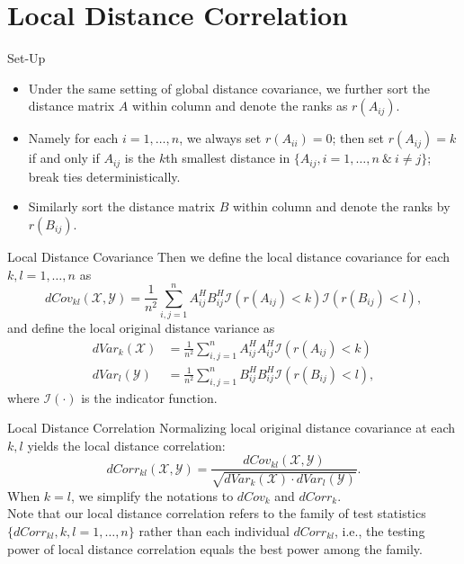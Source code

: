 \documentclass{beamer}
\begin{document}
\section{Local Distance Correlation}
\begin{frame}{Set-Up}
\begin{itemize}[<+->]
\item Under the same setting of global distance covariance, we further sort the distance matrix $A$ within column and denote the ranks as $r(A_{ij})$.
\item Namely for each $i=1, \ldots, n$, we always set $r(A_{ii})=0$; then set $r(A_{ij})=k$ if and only if $A_{ij}$ is the $k$th smallest distance in $\{A_{ij}, i=1,\ldots,n\ \& \ i \neq j\}$; break ties deterministically. 
\item Similarly sort the distance matrix $B$ within column and denote the ranks by $r(B_{ij})$.
\end{itemize}
\end{frame}

\begin{frame}{Local Distance Covariance}
Then we define the local distance covariance for each $k,l=1,\ldots,n$ as
\begin{equation}
\label{localdCovEqu}
dCov_{kl}(\mathcal{X},\mathcal{Y})=\frac{1}{n^2}\sum_{i,j=1}^{n}A^{H}_{ij}B^{H}_{ij}\mathcal{I}(r(A_{ij})<k)\mathcal{I}(r(B_{ij})<l),
\end{equation}
and define the local original distance variance as
\begin{align*}
dVar_{k}(\mathcal{X}) &=\frac{1}{n^2}\sum_{i,j=1}^{n}A^{H}_{ij}A^{H}_{ij}\mathcal{I}(r(A_{ij})<k)\\
dVar_{l}(\mathcal{Y}) &=\frac{1}{n^2}\sum_{i,j=1}^{n}B^{H}_{ij}B^{H}_{ij}\mathcal{I}(r(B_{ij})<l),
\end{align*}
where $\mathcal{I}(\cdot)$ is the indicator function.
\end{frame}

\begin{frame}{Local Distance Correlation}
Normalizing local original distance covariance at each $k,l$ yields the local distance correlation:
\begin{equation}
\label{localdCorrEqu}
dCorr_{kl}(\mathcal{X},\mathcal{Y})=\frac{dCov_{kl}(\mathcal{X},\mathcal{Y})}{\sqrt{dVar_{k}(\mathcal{X}) \cdot dVar_{l}(\mathcal{Y})}}.
\end{equation}
When $k=l$, we simplify the notations to $dCov_{k}$ and $dCorr_{k}$. \\
\pause
\medskip
Note that our local distance correlation refers to the family of test statistics $\{dCorr_{kl}, k,l=1,\ldots,n\}$ rather than each individual $dCorr_{kl}$, i.e., the testing power of local distance correlation equals the best power among the family.
\end{frame}
\end{document}
